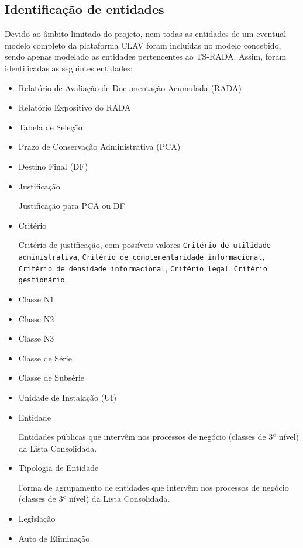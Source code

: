 \documentclass{article}
\newcommand\tab[1][1cm]{\hspace*{#1}}
\begin{document}
\subsection{Identificação de entidades}

\par Devido ao âmbito limitado do projeto, nem todas as entidades de um eventual modelo completo da plataforma CLAV foram incluídas no modelo concebido, sendo apenas modelado as entidades pertencentes ao TS-RADA. Assim, foram identificadas as seguintes entidades:

\begin{itemize}
    \item Relatório de Avaliação de Documentação Acumulada (RADA)
    \item Relatório Expositivo do RADA
    \item Tabela de Seleção
    \item Prazo de Conservação Administrativa (PCA)
    \item Destino Final (DF)
    \item Justificação
        \par \tab Justificação para PCA ou DF
    \item Critério
        \par \tab Critério de justificação, com possíveis valores \texttt{Critério de utilidade administrativa}, \texttt{Critério de complementaridade informacional}, \texttt{Critério de densidade informacional}, \texttt{Critério legal}, \texttt{Critério gestionário}.
    \item Classe N1
    \item Classe N2
    \item Classe N3
    \item Classe de Série
    \item Classe de Subsérie
    \item Unidade de Instalação (UI)
    \item Entidade
        \par \tab Entidades públicas que intervêm nos processos de negócio (classes de 3º nível) da Lista Consolidada.
    \item Tipologia de Entidade
        \par \tab Forma de agrupamento de entidades que intervêm nos processos de negócio (classes de 3º nível) da Lista Consolidada.
    \item Legislação
    \item Auto de Eliminação
\end{itemize}
\end{document}
